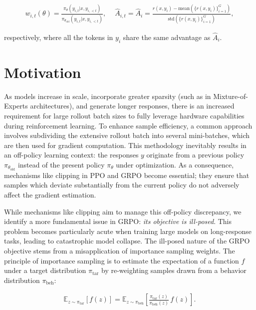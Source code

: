 \begin{align}
    w_{i,t}(\theta)=\frac{ \pi_{\theta} (y_{i,t} | x, y_{i,<t}) }{ \pi_{\theta_\text{old}} (y_{i,t} | x,y_{i,<t})},\quad\ 
    \widehat{A}_{i,t} = \widehat{A}_{i} = \frac{r(x, y_i) - \mathrm{mean} \left( \{ r(x, y_i) \}_{i=1}^G \right) }{ \mathrm{std} \left( \{ r(x, y_i) \}_{i=1}^G \right) },
\end{align}

respectively, where all the tokens in $y_i$ share the same advantage as $\widehat{A}_{i}$.

\section{Motivation}
\label{sec:motivation}

As models increase in scale, incorporate greater sparsity (such as in Mixture-of-Experts architectures), and generate longer responses, there is an increased requirement for large rollout batch sizes to fully leverage hardware capabilities during reinforcement learning. To enhance sample efficiency, a common approach involves subdividing the extensive rollout batch into several mini-batches, which are then used for gradient computation. This methodology inevitably results in an off-policy learning context: the responses $y$ originate from a previous policy $\pi_{\theta_\text{old}}$ instead of the present policy $\pi_\theta$ under optimization. As a consequence, mechanisms like clipping in PPO and GRPO become essential; they ensure that samples which deviate substantially from the current policy do not adversely affect the gradient estimation.

While mechanisms like clipping aim to manage this off-policy discrepancy, we identify a more fundamental issue in GRPO: \textit{its objective is ill-posed}. This problem becomes particularly acute when training large models on long-response tasks, leading to catastrophic model collapse. The ill-posed nature of the GRPO objective stems from a misapplication of importance sampling weights. The principle of importance sampling is to estimate the expectation of a function $f$ under a target distribution $\pi_\text{tar}$ by re-weighting samples drawn from a behavior distribution $\pi_\text{beh}$:

\begin{align}
\mathbb{E}_{z \sim \pi_\text{tar}} \left[ f(z) \right] = \mathbb{E}_{z \sim \pi_\text{beh}} \left[ \frac{ \pi_\text{tar} (z) }{ \pi_\text{beh} (z)} \, f(z) \right].
\end{align}


